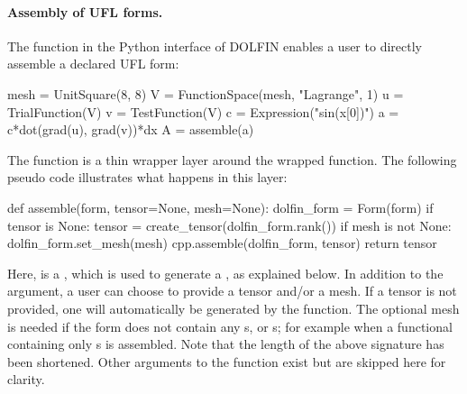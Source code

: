 \paragraph{Assembly of UFL forms.}

The  function in the Python interface of DOLFIN enables
a user to directly assemble a declared UFL form:
\begin{python}
mesh = UnitSquare(8, 8)
V = FunctionSpace(mesh, "Lagrange", 1)
u = TrialFunction(V)
v = TestFunction(V)
c = Expression("sin(x[0])")
a = c*dot(grad(u), grad(v))*dx
A = assemble(a)
\end{python}
The  function is a thin wrapper layer around the wrapped
 function. The following pseudo code illustrates what
happens in this layer:
\begin{python}
def assemble(form, tensor=None, mesh=None):
    dolfin_form = Form(form)
    if tensor is None:
        tensor = create_tensor(dolfin_form.rank())
    if mesh is not None:
        dolfin_form.set_mesh(mesh)
    cpp.assemble(dolfin_form, tensor)
    return tensor
\end{python}
Here,  is a , which is used to generate a
, as explained below. In addition to the 
argument, a user can choose to provide a tensor and/or a mesh. If a
tensor is not provided, one will automatically be generated by the
 function. The optional mesh is needed if the form
does not contain any s, or s; for example
when a functional containing only s is assembled. Note
that the length of the above signature has been shortened. Other
arguments to the  function exist but are skipped here
for clarity.

